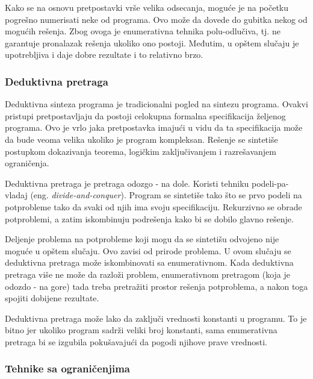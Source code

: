 Kako se na osnovu pretpostavki vrše velika odsecanja, moguće je na početku pogrešno numerisati neke od programa. Ovo može da dovede do gubitka nekog od mogućih rešenja. Zbog ovoga je enumerativna tehnika polu-odlučiva, tj. ne garantuje pronalazak rešenja ukoliko ono postoji. Međutim, u opštem slučaju je upotrebljiva i daje dobre rezultate i to relativno brzo.


\subsubsection{Deduktivna pretraga}
\label{subsubsec:Deductive}

Deduktivna sinteza programa je tradicionalni pogled na sintezu programa. Ovakvi pristupi pretpostavljaju da postoji celokupna formalna spe\-ci\-fi\-ka\-ci\-ja željenog programa. Ovo je vrlo jaka pretpostavka imajući u vidu da ta specifikacija može da bude veoma velika ukoliko je program kompleksan. Rešenje se sintetiše postupkom dokazivanja teorema, logičkim zaključivanjem i razrešavanjem ograničenja.

Deduktivna pretraga je pretraga odozgo - na dole. Koristi tehniku podeli-pa-vladaj (eng. \emph{divide-and-conquer}). Program se sintetiše tako što se prvo podeli na potprobleme tako da svaki od njih ima svoju specifikaciju. Rekurzivno se obrade potproblemi, a zatim iskombinuju podrešenja kako bi se dobilo glavno rešenje.

Deljenje problema na potprobleme koji mogu da se sintetišu odvojeno nije moguće u opštem slučaju. Ovo zavisi od prirode problema. U ovom slučaju se deduktivna pretraga može iskombinovati sa enumerativnom. Kada deduktivna pretraga više ne može da razloži problem, enumerativnom pretragom (koja je odozdo - na gore) tada treba pretražiti prostor rešenja potproblema, a nakon toga spojiti dobijene rezultate.

Deduktivna pretraga može lako da zaključi vrednosti konstanti u programu. To je bitno jer ukoliko program sadrži veliki broj konstanti, sama enumerativna pretraga bi se izgubila pokušavajući da pogodi njihove prave vrednosti.


\subsubsection{Tehnike sa ograničenjima}
\label{subsubsec:ConstraintSolving}

